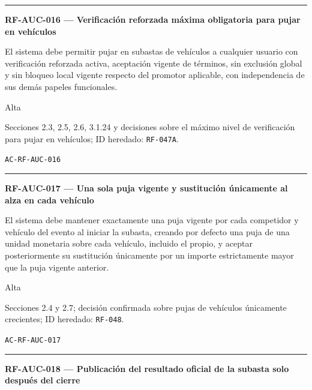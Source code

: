 \documentclass[10pt,letterpaper]{article}
\begin{document}
\vspace{0.25em}\hrule\vspace{0.65em}
\noindent\textbf{RF-AUC-016 --- Verificación reforzada máxima obligatoria para pujar en vehículos}\par
\begin{description}[style=nextline,leftmargin=3.15cm,labelwidth=2.8cm,font=\normalfont\bfseries]
\item[Obligación] El sistema debe permitir pujar en subastas de vehículos a cualquier usuario con verificación reforzada activa, aceptación vigente de términos, sin exclusión global y sin bloqueo local vigente respecto del promotor aplicable, con independencia de sus demás papeles funcionales.
\item[Prioridad] Alta
\item[Procedencia] Secciones 2.3, 2.5, 2.6, 3.1.24 y decisiones sobre el máximo nivel de verificación para pujar en vehículos; ID heredado: \texttt{RF-047A}.
\item[Verificación] \texttt{AC-RF-AUC-016}
\end{description}
\vspace{0.25em}\hrule\vspace{0.65em}
\noindent\textbf{RF-AUC-017 --- Una sola puja vigente y sustitución únicamente al alza en cada vehículo}\par
\begin{description}[style=nextline,leftmargin=3.15cm,labelwidth=2.8cm,font=\normalfont\bfseries]
\item[Obligación] El sistema debe mantener exactamente una puja vigente por cada competidor y vehículo del evento al iniciar la subasta, creando por defecto una puja de una unidad monetaria sobre cada vehículo, incluido el propio, y aceptar posteriormente su sustitución únicamente por un importe estrictamente mayor que la puja vigente anterior.
\item[Prioridad] Alta
\item[Procedencia] Secciones 2.4 y 2.7; decisión confirmada sobre pujas de vehículos únicamente crecientes; ID heredado: \texttt{RF-048}.
\item[Verificación] \texttt{AC-RF-AUC-017}
\end{description}
\vspace{0.25em}\hrule\vspace{0.65em}
\noindent\textbf{RF-AUC-018 --- Publicación del resultado oficial de la subasta solo después del cierre}\par
\end{document}
